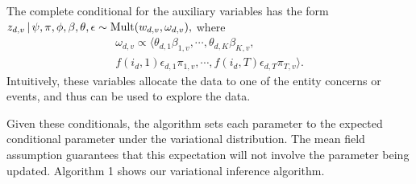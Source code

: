 The complete conditional for the auxiliary variables has the form
$z_{d,v} \, | \, \psi, \pi, \phi, \beta, \theta, \epsilon \sim \mbox{Mult}(w_{d,v}, \omega_{d,v}),$ where
\begin{multline}
\omega_{d,v} \propto \langle 
\theta_{d,1} \beta_{1,v}, \cdots, \theta_{d,K} \beta_{K,v}, \\
f(i_d, 1) \epsilon_{d,1} \pi_{1,v}, \cdots, f(i_d, T) \epsilon_{d,T} \pi_{T,v}\rangle.
\label{eq:omega}
\end{multline}
Intuitively, these variables allocate the data to one of the entity concerns or events, and thus can be used to explore the data.

Given these conditionals, the algorithm sets each parameter to the expected conditional parameter under the variational distribution. The mean field assumption guarantees that this expectation will not involve the parameter being updated.  Algorithm 1 shows our variational inference algorithm. 



